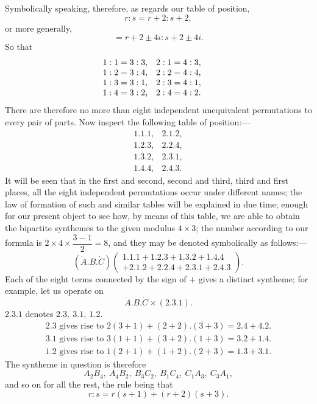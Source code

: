 \documentclass[11pt]{article}
\newcommand{\sourcepage}[1]{\marginpar{\scriptsize p.~#1}}
\newcommand{\dotter}[1]{\dot{#1}}
\begin{document}
\sourcepage{98}
Symbolically speaking, therefore, as regards our table of position,
\[
r:s=r+2:s+2,
\]
or more generally,
\[
=r+2\pm4i:s+2\pm4i.
\]
So that
\[
\begin{array}{ll@{\qquad}ll}
1:1=3:3,&2:1=4:3,\\
1:2=3:4,&2:2=4:4,\\
1:3=3:1,&2:3=4:1,\\
1:4=3:2,&2:4=4:2.
\end{array}
\]
There are therefore no more than eight independent unequivalent permutations to every pair of parts. Now inspect the following table of position:---
\[
\begin{array}{cc}
1.1.1,&2.1.2,\\
1.2.3,&2.2.4,\\
1.3.2,&2.3.1,\\
1.4.4,&2.4.3.
\end{array}
\]
It will be seen that in the first and second, second and third, third and first places, all the eight independent permutations occur under different names; the law of formation of such and similar tables will be explained in due time; enough for our present object to see how, by means of this table, we are able to obtain the bipartite synthemes to the given modulus $4\times3$; the number according to our formula is $2\times4\times\dfrac{3-1}{2}=8$, and they may be denoted symbolically as follows:---
\[
(\dotter A.B.\dotter C)
\left(\begin{array}{l}
1.1.1+1.2.3+1.3.2+1.4.4\\
+2.1.2+2.2.4+2.3.1+2.4.3
\end{array}\right).
\]
Each of the eight terms connected by the sign of $+$ gives a distinct syntheme; for example, let us operate on
\[
\dotter A.B.\dotter C\times(2.3.1).
\]
$2.3.1$ denotes $2.3,\ 3.1,\ 1.2$.
\[
\begin{array}{l}
2.3\text{ gives rise to }2(3+1)+(2+2).(3+3)=2.4+4.2.\\
3.1\text{ gives rise to }3(1+1)+(3+2).(1+3)=3.2+1.4.\\
1.2\text{ gives rise to }1(2+1)+(1+2).(2+3)=1.3+3.1.
\end{array}
\]
The syntheme in question is therefore
\[
A_2B_4,\ A_4B_2,\ B_3C_2,\ B_1C_4,\ C_1A_3,\ C_3A_1,
\]
and so on for all the rest, the rule being that
\[
r:s=r(s+1)+(r+2)(s+3).
\]
\end{document}
